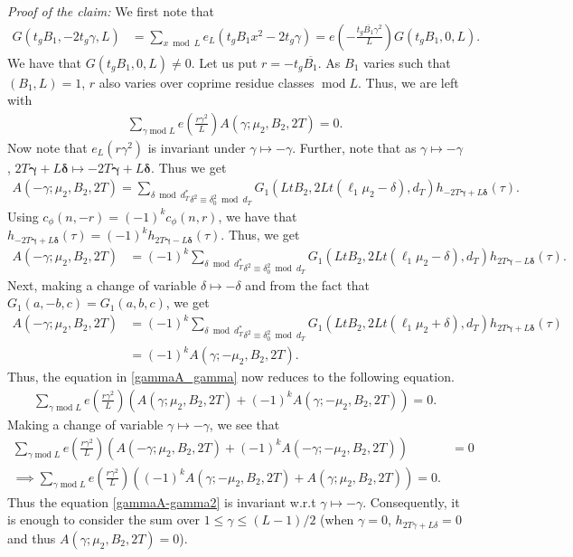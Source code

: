 \documentclass[11pt]{amsart}
\numberwithin{equation}{section}
\renewcommand*{\mod}{\operatorname{mod}}
\begin{document}
\textit{Proof of the claim:} We first note that 
\begin{align}
G(t_gB_1, -2t_g\gamma, L)&=\sum_{x\bmod L}e_L(t_gB_1x^2-2t_g\gamma)=e\left(-\frac{t_g\overline{B_1}\gamma^2}{L}\right)G(t_gB_1, 0, L).
\end{align}
We have that $G(t_gB_1, 0, L)\neq 0$. Let us put $r=-t_g\overline{B_1} $. As $B_1$ varies such that $(B_1, L)=1$, $r$ also varies over coprime residue classes $\mod L$.  Thus, we are left with
\begin{align}
\sum_{\gamma\mod L}e\left(\frac{r\gamma^2}{L} \right)A(\gamma; \mu_2, B_2, 2T)=0 .   
\end{align}
Now note that $e_{L}\left(r\gamma^2 \right)$ is invariant under $\gamma\mapsto -\gamma$.  Further, note that as $\gamma\mapsto -\gamma$, $2T{\bm{ \gamma}}+L\bm{\delta}\mapsto -2T\bm{\gamma}+L\bm\delta$. Thus we get
\begin{align}
A(-\gamma; \mu_2, B_2, 2T)=   \underset{{\delta}^2\equiv {\delta}_{0}^2 \bmod d_T}{\sum_{\delta\bmod d_T^*}}G_1(LtB_2, 2Lt (\ell_1\mu_2-\delta), d_T) h_{-2T\bm{\gamma}+L\bm\delta}(\tau).  
\end{align}
Using  $c_\phi(n,-r)=(-1)^kc_\phi(n,r)$, we have that $h_{-2T\bm{\gamma}+L\bm\delta}(\tau)=(-1)^k h_{2T\bm{\gamma}-L\bm\delta}(\tau)$. Thus, we get
\begin{align}
 A(-\gamma; \mu_2, B_2, 2T)&= (-1)^k  \underset{{\delta}^2\equiv {\delta}_{0}^2 \bmod d_T}{\sum_{\delta\bmod d_T^*}} G_1(LtB_2, 2Lt (\ell_1\mu_2-\delta), d_T)h_{2T\bm{\gamma}-L\bm\delta}(\tau).   
\end{align}
Next, making a change of variable $\delta\mapsto -\delta$ and from the fact that $G_1(a,-b,c)=G_1(a,b,c)$,  we get
\begin{align}
A(-\gamma; \mu_2, B_2, 2T)&= (-1)^k   \underset{{\delta}^2\equiv {\delta}_{0}^2 \bmod d_T}{\sum_{\delta\bmod d_T^*}} G_1(LtB_2, 2L t(\ell_1\mu_2+\delta), d_T)h_{2T\bm{\gamma}+L\bm\delta}(\tau)\\
&= (-1)^k A(\gamma; -\mu_2, B_2, 2T).\label{AgammaA-gamma}
\end{align}
Thus, the equation in \eqref{gammaA_gamma} now reduces to the following equation.
\begin{align}\label{gammaA-gamma2}
\sum_{\gamma\mod L}e\left(\frac{r\gamma^2}{L} \right)\left(A(\gamma; \mu_2, B_2, 2T)+(-1)^kA(\gamma; -\mu_2, B_2, 2T) \right)=0 .   
\end{align}
Making a change of variable $\gamma\mapsto -\gamma$, we see that
\begin{align}
\sum_{\gamma\mod L}e\left(\frac{r\gamma^2}{L} \right)\left(A(-\gamma; \mu_2, B_2, 2T)+(-1)^kA(-\gamma; -\mu_2, B_2, 2T) \right)&=0\\
\implies\sum_{\gamma\mod L}e\left(\frac{r\gamma^2}{L} \right)\left((-1)^kA(\gamma; -\mu_2, B_2, 2T)+A(\gamma; \mu_2, B_2, 2T) \right)=0.
\end{align}
Thus the equation \eqref{gammaA-gamma2} is invariant w.r.t $\gamma\mapsto -\gamma$. Consequently, it is enough to consider the sum over $1\le \gamma\le (L-1)/2$ (when $\gamma=0$, $h_{2T\gamma+L\delta}=0$ and thus $A(\gamma; \mu_2, B_2, 2T)=0$).
\end{document}
